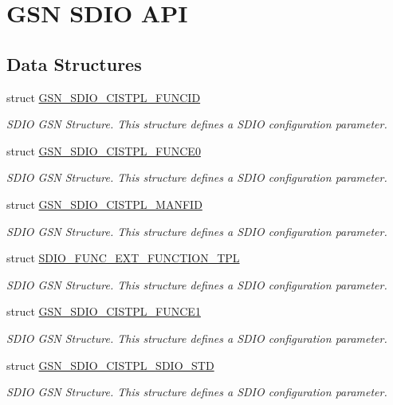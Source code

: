 \hypertarget{a00653}{
\section{GSN SDIO API}
\label{a00653}
}
\subsection*{Data Structures}
\begin{DoxyCompactItemize}
\item 
struct \hyperlink{a00221}{GSN\_\-SDIO\_\-CISTPL\_\-FUNCID}
\begin{DoxyCompactList}\small\item\em SDIO GSN Structure. This structure defines a SDIO configuration parameter. \end{DoxyCompactList}\item 
struct \hyperlink{a00219}{GSN\_\-SDIO\_\-CISTPL\_\-FUNCE0}
\begin{DoxyCompactList}\small\item\em SDIO GSN Structure. This structure defines a SDIO configuration parameter. \end{DoxyCompactList}\item 
struct \hyperlink{a00222}{GSN\_\-SDIO\_\-CISTPL\_\-MANFID}
\begin{DoxyCompactList}\small\item\em SDIO GSN Structure. This structure defines a SDIO configuration parameter. \end{DoxyCompactList}\item 
struct \hyperlink{a00458}{SDIO\_\-FUNC\_\-EXT\_\-FUNCTION\_\-TPL}
\begin{DoxyCompactList}\small\item\em SDIO GSN Structure. This structure defines a SDIO configuration parameter. \end{DoxyCompactList}\item 
struct \hyperlink{a00220}{GSN\_\-SDIO\_\-CISTPL\_\-FUNCE1}
\begin{DoxyCompactList}\small\item\em SDIO GSN Structure. This structure defines a SDIO configuration parameter. \end{DoxyCompactList}\item 
struct \hyperlink{a00223}{GSN\_\-SDIO\_\-CISTPL\_\-SDIO\_\-STD}
\begin{DoxyCompactList}\small\item\em SDIO GSN Structure. This structure defines a SDIO configuration parameter. \end{DoxyCompactList}\item 

\end{DoxyCompactItemize}
